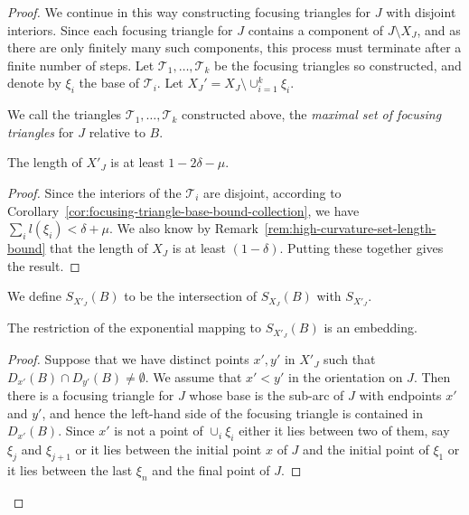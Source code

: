 \begin{proof}
We continue in this way constructing focusing triangles for $J$ with
disjoint interiors. Since each focusing triangle for $J$ contains a
component of $J\setminus X_J$, and as there are only finitely many
such components, this process must terminate after a finite number
of steps. Let ${\mathcal T}_1,\ldots,{\mathcal T}_k$ be the focusing
triangles so constructed, and denote by $\xi_i$ the base of
${\mathcal T}_i$. Let $X_J'= X_J\setminus \cup_{i=1}^k\xi_i$.

\begin{definition}
\label{def:maximal-focusing-triangle-set}
We call the triangles ${\mathcal T}_1,\ldots,{\mathcal T}_k$
constructed above, the {\em maximal set of focusing triangles} for
$J$ relative to $B$.
\end{definition}



\begin{claim}
\label{claim:remaining-set-length-bound}
The length of $X'_J$ is at least $1-2\delta-\mu$.
\end{claim}

\begin{proof}
Since the interiors of the ${\mathcal T}_i$ are disjoint, according
to Corollary~\ref{cor:focusing-triangle-base-bound-collection}, we have $\sum_il(\xi_i)<\delta+\mu$. We
also know by Remark~\ref{rem:high-curvature-set-length-bound} that the length of $X_J$ is at
least $(1-\delta)$. Putting these together gives the result.
\end{proof}

We define $S_{X'_J}(B)$ to be the intersection of $S_{X_J}(B)$ with
$S_{X'_J}$.

\begin{claim}
\label{claim:exponential-map-embedding-on-remainder}
The restriction of the exponential mapping to $S_{X'_J}(B)$ is an
embedding.
\end{claim}

\begin{proof}
Suppose that we have distinct points $x',y'$ in $X'_J$ such that
$D_{x'}(B)\cap D_{y'}(B)\not=\emptyset$. We assume that $x'<y'$ in
the orientation on $J$. Then there is a focusing triangle for $J$
whose base is the sub-arc of $J$ with endpoints $x'$ and $y'$, and
hence the left-hand side of the focusing triangle is contained in
$D_{x'}(B)$. Since $x'$ is not a point of $\cup_{i}\xi_i$ either it
lies between two of them, say $\xi_j$ and $\xi_{j+1}$ or it lies
between the initial point $x$ of $J$ and the initial point of
$\xi_1$ or it lies between the last $\xi_n$ and the final point of
$J$.


\end{proof}
\end{proof}
